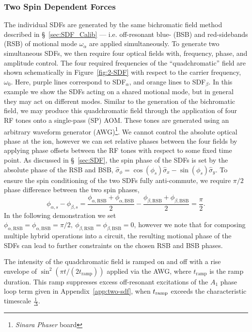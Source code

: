 \subsubsection{Two Spin Dependent Forces}
    The individual SDFs are generated by the same bichromatic field method
    described in \S~\ref{sec:SDF_Calib} --- i.e. off-resonant blue-
    (BSB) and red-sidebands (RSB) of motional mode $\omega_\alpha$ are applied simultaneously.
    To generate two simultaneous SDFs, we then require four optical fields with, frequency, phase, and
    amplitude control. The four required frequencies of the ``quadchromatic''
    field are shown schematically in Figure~\ref{fig:2-SDF} with respect to the
    carrier frequency, $\omega_0$. Here, purple lines correspond to
    SDF$_\alpha$, and orange lines to SDF$_\beta$. In this example we show the
    SDFs acting on a shared motional mode, but in general they may act on
    different modes. Similar to the generation of the bichromatic field, we may produce this
    quadchromatic field through the application of four RF tones onto a
    single-pass (SP) AOM. These tones are generated using an arbitrary waveform
    generator (AWG)\footnote{\emph{Sinara Phaser} board}. We cannot control the
    absolute optical phase at the ion, however we can set relative phases
    between the four fields by applying phase offsets between the RF tones with
    respect to some fixed time point.
    As discussed in \S~\ref{sec:SDF}, the spin phase of the SDFs is set by
    the absolute phase of the RSB and BSB, $\hat\sigma_\phi =
    \cos(\phi_s)\hat\sigma_x - \sin(\phi_s)\hat\sigma_y$. 
    To ensure the spin conditioning of the two SDFs fully anti-commute, 
    we require
    $\pi/2$ phase difference between the two spin phases,
    \begin{equation}
        \label{eqn:spin_phase}
        \phi_{\alpha, s} - \phi_{\beta,s} = \frac{\phi_{\alpha,\mathrm{RSB}}+\phi_{\alpha,\mathrm{BSB}}}{2}-\frac{\phi_{\beta,\mathrm{RSB}}+\phi_{\beta,\mathrm{BSB}}}{2}=\frac{\pi}{2}.
    \end{equation}
    In the following demonstration we set $\phi_{\alpha,\mathrm{RSB}}=
    \phi_{\alpha,\mathrm{BSB}}=\pi/2,~\phi_{\beta,\mathrm{RSB}}=\phi_{\beta,\mathrm{BSB}}=0$,
    however we note that for composing multiple hybrid operations into a
    circuit, the resulting motional phase of the SDFs can lead to further
    constraints on the chosen RSB and BSB phases.

    The intensity of the quadchromatic field is ramped on and off with a rise
    envelope of $\sin^2(\pi t/(2t_\mathrm{ramp}))$ applied via the AWG, where
    $t_\mathrm{ramp}$ is the ramp duration. This ramp suppresses excess off-resonant
    excitations of the $A_1$ phase loop term given in Appendix~\ref{app:two-sdf}, when $t_{\rm ramp}$ exceeds the characteristic timescale 
    $\frac{1}{\Delta}$. 

